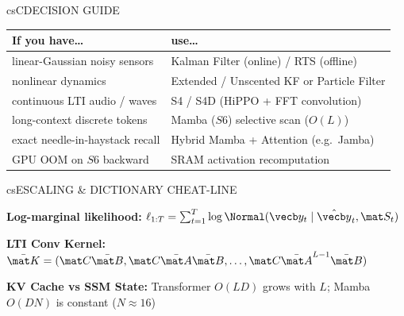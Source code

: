 \documentclass[../../../../master.tex]{subfiles}
\begin{document}
\begin{cscolumns}
\begin{cscard}{csC}{DECISION GUIDE}
  \renewcommand{\arraystretch}{1.22}\small
  \begin{tabular}{@{}>{\raggedright\arraybackslash}p{3.1cm}>{\raggedright\arraybackslash}p{4.6cm}@{}}
    \textbf{If you have\ldots} & \textbf{use\ldots}\\ \hline
    linear-Gaussian noisy sensors & Kalman Filter (online) / RTS (offline)\\
    nonlinear dynamics & Extended / Unscented KF or Particle Filter\\
    continuous LTI audio / waves & S4 / S4D (HiPPO + FFT convolution)\\
    long-context discrete tokens & Mamba ($S6$) selective scan ($O(L)$)\\
    exact needle-in-haystack recall & Hybrid Mamba + Attention (e.g.\ Jamba)\\
    GPU OOM on $S6$ backward & SRAM activation recomputation\\
  \end{tabular}
\end{cscard}

\begin{cscard}{csE}{SCALING \& DICTIONARY CHEAT-LINE}
  \begin{csbul}
    \item \textbf{Log-marginal likelihood:} $\ell_{1:T} = \sum_{t=1}^T \log\Normal(\vecb y_t\mid\hat{\vecb y}_t,\mat S_t)$
    \item \textbf{LTI Conv Kernel:} $\bar{\mat K}=(\mat C\bar{\mat B},\mat C\bar{\mat A}\bar{\mat B},\dots,\mat C\bar{\mat A}^{L-1}\bar{\mat B})$
    \item \textbf{KV Cache vs SSM State:} Transformer $O(LD)$ grows with $L$; Mamba $O(DN)$ is constant ($N\approx 16$)
  \end{csbul}
\end{cscard}


\end{cscolumns}
\end{document}
